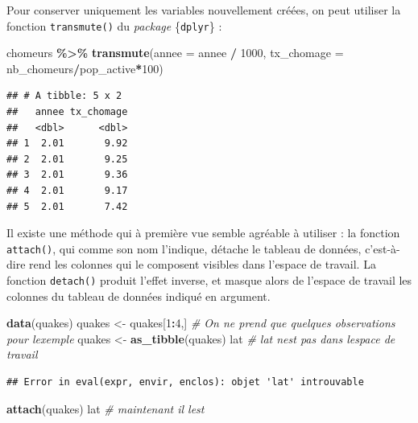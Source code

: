 \documentclass[
  11pt,
]{book}
\newenvironment{Shaded}{\begin{snugshade}}{\end{snugshade}}
\newcommand{\CommentTok}[1]{\textcolor[rgb]{0.56,0.35,0.01}{\textit{#1}}}
\newcommand{\DataTypeTok}[1]{\textcolor[rgb]{0.13,0.29,0.53}{#1}}
\newcommand{\DecValTok}[1]{\textcolor[rgb]{0.00,0.00,0.81}{#1}}
\newcommand{\KeywordTok}[1]{\textcolor[rgb]{0.13,0.29,0.53}{\textbf{#1}}}
\newcommand{\NormalTok}[1]{#1}
\newcommand{\OperatorTok}[1]{\textcolor[rgb]{0.81,0.36,0.00}{\textbf{#1}}}
\newcommand{\StringTok}[1]{\textcolor[rgb]{0.31,0.60,0.02}{#1}}
\numberwithin{equation}{section}
\numberwithin{countremarque}{section}
\begin{document}
Pour conserver uniquement les variables nouvellement créées, on peut utiliser la fonction \texttt{transmute()} du \emph{package} \{\texttt{dplyr}\} :

\begin{Shaded}
\begin{Highlighting}[]
\NormalTok{chomeurs }\OperatorTok{\%\textgreater{}\%}\StringTok{ }
\StringTok{  }\KeywordTok{transmute}\NormalTok{(}\DataTypeTok{annee =}\NormalTok{ annee }\OperatorTok{/}\StringTok{ }\DecValTok{1000}\NormalTok{,}
            \DataTypeTok{tx\_chomage =}\NormalTok{ nb\_chomeurs}\OperatorTok{/}\NormalTok{pop\_active}\OperatorTok{*}\DecValTok{100}\NormalTok{)}
\end{Highlighting}
\end{Shaded}

\begin{lstlisting}
## # A tibble: 5 x 2
##   annee tx_chomage
##   <dbl>      <dbl>
## 1  2.01       9.92
## 2  2.01       9.25
## 3  2.01       9.36
## 4  2.01       9.17
## 5  2.01       7.42
\end{lstlisting}

Il existe une méthode qui à première vue semble agréable à utiliser : la fonction \texttt{attach()}, qui comme son nom l'indique, détache le tableau de données, c'est-à-dire rend les colonnes qui le composent visibles dans l'espace de travail. La fonction \texttt{detach()} produit l'effet inverse, et masque alors de l'espace de travail les colonnes du tableau de données indiqué en argument.

\begin{Shaded}
\begin{Highlighting}[]
\KeywordTok{data}\NormalTok{(quakes)}
\NormalTok{quakes \textless{}{-}}\StringTok{ }\NormalTok{quakes[}\DecValTok{1}\OperatorTok{:}\DecValTok{4}\NormalTok{,]  }\CommentTok{\# On ne prend que quelques observations pour l\textquotesingle{}exemple}
\NormalTok{quakes \textless{}{-}}\StringTok{ }\KeywordTok{as\_tibble}\NormalTok{(quakes)}
\NormalTok{lat  }\CommentTok{\# lat n\textquotesingle{}est pas dans l\textquotesingle{}espace de travail}
\end{Highlighting}
\end{Shaded}

\begin{lstlisting}
## Error in eval(expr, envir, enclos): objet 'lat' introuvable
\end{lstlisting}

\begin{Shaded}
\begin{Highlighting}[]
\KeywordTok{attach}\NormalTok{(quakes)}
\NormalTok{lat }\CommentTok{\# maintenant il l\textquotesingle{}est}
\end{Highlighting}
\end{Shaded}
\end{document}
